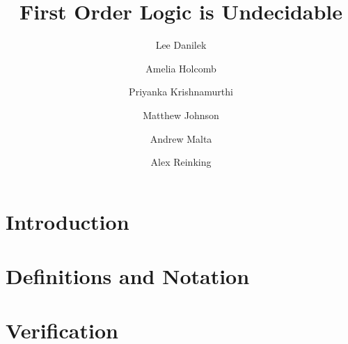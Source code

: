 \documentclass{article}
\title{First Order Logic is Undecidable}
\author{Lee Danilek \and Amelia Holcomb \and Priyanka Krishnamurthi \and Matthew Johnson \and Andrew Malta \and Alex Reinking}
\theoremstyle{definition}
\theoremstyle{definition}
\numberwithin{equation}{section}
\begin{document}
\maketitle

\section{Introduction}


\section{Definitions and Notation}


\section{Verification}

\end{document}
